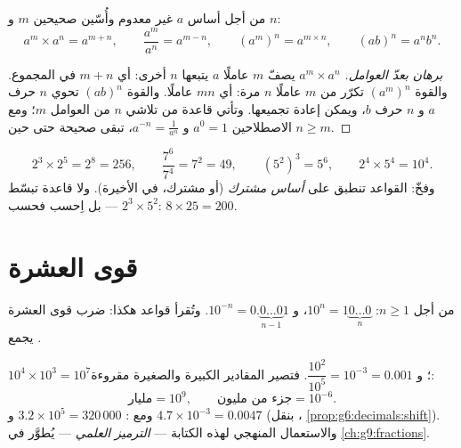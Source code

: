 \begin{theorem}\label{thm:g8:powers:rules}
من أجل أساس $a$ غير معدوم وأُسّين صحيحين $m$ و $n$:
\[
a^m \times a^n = a^{m+n},
\qquad
\frac{a^m}{a^n} = a^{m-n},
\qquad
\left(a^m\right)^n = a^{m \times n},
\qquad
(ab)^n = a^n b^n .
\]
\end{theorem}

\begin{proof}[برهان بعدّ العوامل]
 $a^m \times a^n$ يصفّ $m$ عاملًا $a$ يتبعها $n$ أخرى:
أي $m + n$ في المجموع. والقوة $\left(a^m\right)^n$ تكرّر  من $m$ عاملًا
$n$ مرة: أي $mn$ عاملًا. والقوة $(ab)^n$ تحوي $n$ حرف $a$ و $n$
حرف $b$، ويمكن إعادة تجميعها. وتأتي قاعدة  من
تلاشي $n$ من العوامل $m$؛ ومع الاصطلاحين
$a^0 = 1$ و $a^{-n} = \frac{1}{a^n}$، تبقى صحيحة حتى حين
$n \geq m$.
\end{proof}

\begin{example}\label{ex:g8:powers:rules}
\[
2^3 \times 2^5 = 2^8 = 256,
\qquad
\frac{7^6}{7^4} = 7^2 = 49,
\qquad
\left(5^2\right)^3 = 5^6,
\qquad
2^4 \times 5^4 = 10^4 .
\]
وفخّ: القواعد تنطبق على \emph{أساس مشترك} (أو 
مشترك، في الأخيرة). ولا قاعدة تبسّط $2^3 \times 5^2$ ---
بل اِحسب فحسب: $8 \times 25 = 200$.
\end{example}

\section{قوى العشرة}

\begin{proposition}\label{prop:g8:powers:ten}
من أجل $n \geq 1$: $10^n = 1\underbrace{0\dots0}_{n}$، و
$10^{-n} = 0.\underbrace{0\dots0}_{n-1}1$. وتُقرأ قواعد 
هكذا: ضرب قوى العشرة يجمع .
\end{proposition}

\begin{example}\label{ex:g8:powers:ten}
$10^4 \times 10^3 = 10^7$؛ \quad
و $\dfrac{10^2}{10^5} = 10^{-3} = 0.001$. فتصير المقادير الكبيرة والصغيرة
مقروءة:
\[
\text{مليار} = 10^9,
\qquad
\text{جزء من مليون} = 10^{-6}.
\]
ومع : $3.2 \times 10^5 = 320\,000$ و
$4.7 \times 10^{-3} = 0.0047$ (بنقل ،
\cref{prop:g6:decimals:shift}). والاستعمال المنهجي لهذه الكتابة ---
\emph{الترميز العلمي} --- يُطوَّر في
\cref{ch:g9:fractions}.
\end{example}

